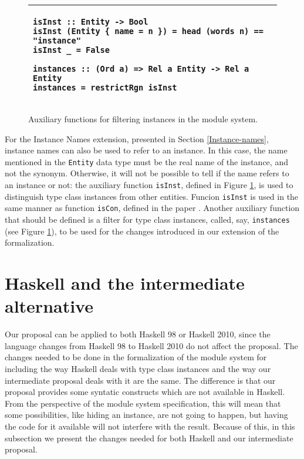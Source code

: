 \documentclass[msc]{ppgccufmg}
\begin{document}
{\begin{figure}
\caption{Auxiliary functions for filtering instances in the module
  system.\label{new}}
\begin{tabular}{|p{\textwidth}|}
\hline
\begin{verbatim}
isInst :: Entity -> Bool
isInst (Entity { name = n }) = head (words n) == "instance"
isInst _ = False

instances :: (Ord a) => Rel a Entity -> Rel a Entity
instances = restrictRgn isInst
\end{verbatim}
\\
\hline
\end{tabular}
\end{figure}

For the Instance Names extension, presented in Section
\ref{Instance-names}, instance names can also be used to refer to an
instance. In this case, the name mentioned in the \texttt{Entity} data
type must be the real name of the instance, and not the synonym.
Otherwise, it will not be possible to tell if the name refers to an
instance or not: the auxiliary function \texttt{isInst}, defined in
Figure \ref{new}, is used to distinguish type class instances from
other entities. Funcion \texttt{isInst} is used in the same manner as
function \texttt{isCon}, defined in the paper \citep[section
  3.1]{formal}. Another auxiliary function that should be defined is a
filter for type class instances, called, say, \texttt{instances} (see
Figure \ref{new}), to be used for the changes introduced in our
extension of the formalization. 

\section{Haskell and the intermediate alternative}
Our proposal can be applied to both Haskell 98 or Haskell 2010, since
the language changes from Haskell 98 to Haskell 2010 do not affect the
proposal.  The changes needed to be done in the formalization of the module
system for including the way Haskell deals with type class
instances and the way our intermediate proposal deals with it are the
same.  The difference is that our proposal provides some syntatic
constructs which are not available in Haskell.  From the
perspective of the module system specification, this will mean that
some possibilities, like hiding an instance, are not going to happen,
but having the code for it available will not interfere with the
result.  Because of this, in this subsection we present the changes
needed for both Haskell and our intermediate proposal.

}
\end{document}
